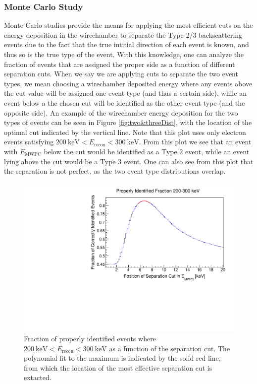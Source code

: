 \subsubsection{Monte Carlo Study}
Monte Carlo studies provide the
means for applying the most efficient cuts on the energy deposition in the wirechamber
to separate the Type 2/3 backscattering events due to the fact that the true intitial direction of each event
is known, and thus so is the true type of the event. With this knowledge, one can analyze the fraction of events
that are assigned the proper side as a function of different separation cuts. When we say we are applying cuts to
separate the two event types, we mean choosing a wirechamber deposited energy where
any events above the cut value will be assigned one event type (and thus a certain side), while an event below
a the chosen cut will be identified as the other event type (and the opposite side). An example of the
wirechamber energy deposition for the two types of events can be seen in
Figure \ref{fig:two&threeDist}, with the location of the optimal cut indicated by the
vertical line. Note that this plot uses only electron events satisfying
$200\mathrm{~keV}<E_{\mathrm{recon}}<300\mathrm{~keV}$.
From this plot we see that an event with $E_{\mathrm{MWPC}}$
below the cut would be identified as a Type 2 event, while an event lying above the cut
would be a Type 3 event. One can also see from this plot that the separation is not perfect,
as the two event type distributions overlap.

\begin{figure}[h]
  \centering
  \includegraphics[scale=0.55,page=1]{4-UCNACalibrations/properly_identified_2011_200-300keV.pdf}
  \caption{Fraction of properly identified events where
    $200\mathrm{~keV}<E_{\mathrm{recon}}<300\mathrm{~keV}$ as a function of the separation cut.
    The polynomial fit to the maximum is indicated by the solid red line, from which the location
    of the most effective separation cut is extacted.}
  \label{fig:propID}
\end{figure}

